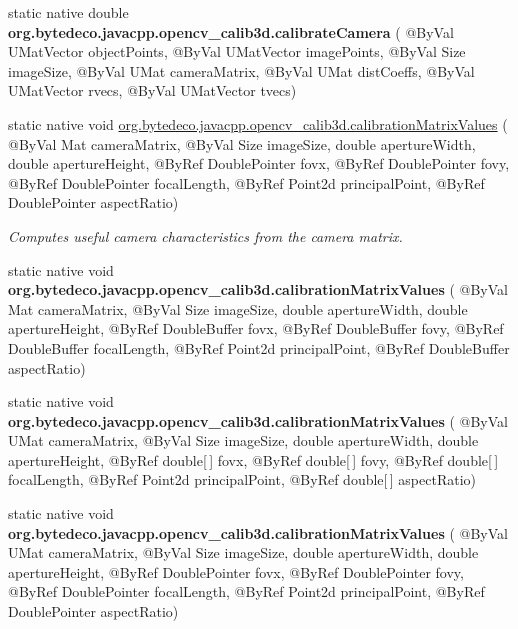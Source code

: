 \begin{DoxyCompactItemize}
static native double {\bfseries org.\+bytedeco.\+javacpp.\+opencv\+\_\+calib3d.\+calibrate\+Camera} ( @By\+Val U\+Mat\+Vector object\+Points, @By\+Val U\+Mat\+Vector image\+Points, @By\+Val Size image\+Size, @By\+Val U\+Mat camera\+Matrix, @By\+Val U\+Mat dist\+Coeffs, @By\+Val U\+Mat\+Vector rvecs, @By\+Val U\+Mat\+Vector tvecs)
\item 
static native void \hyperlink{group__calib3d_ga35bea5b10b8dfd23238f72e9a2e2ac27}{org.\+bytedeco.\+javacpp.\+opencv\+\_\+calib3d.\+calibration\+Matrix\+Values} ( @By\+Val Mat camera\+Matrix, @By\+Val Size image\+Size, double aperture\+Width, double aperture\+Height, @By\+Ref Double\+Pointer fovx, @By\+Ref Double\+Pointer fovy, @By\+Ref Double\+Pointer focal\+Length, @By\+Ref Point2d principal\+Point, @By\+Ref Double\+Pointer aspect\+Ratio)
\begin{DoxyCompactList}\small\item\em Computes useful camera characteristics from the camera matrix. \end{DoxyCompactList}\item 
\mbox{\label{group__calib3d_ga965805632830d6c180c894a5e9c1a1c6}} 
static native void {\bfseries org.\+bytedeco.\+javacpp.\+opencv\+\_\+calib3d.\+calibration\+Matrix\+Values} ( @By\+Val Mat camera\+Matrix, @By\+Val Size image\+Size, double aperture\+Width, double aperture\+Height, @By\+Ref Double\+Buffer fovx, @By\+Ref Double\+Buffer fovy, @By\+Ref Double\+Buffer focal\+Length, @By\+Ref Point2d principal\+Point, @By\+Ref Double\+Buffer aspect\+Ratio)
\item 
\mbox{\label{group__calib3d_ga3624140df267680d7e2d3272dce97372}} 
static native void {\bfseries org.\+bytedeco.\+javacpp.\+opencv\+\_\+calib3d.\+calibration\+Matrix\+Values} ( @By\+Val U\+Mat camera\+Matrix, @By\+Val Size image\+Size, double aperture\+Width, double aperture\+Height, @By\+Ref double\mbox{[}$\,$\mbox{]} fovx, @By\+Ref double\mbox{[}$\,$\mbox{]} fovy, @By\+Ref double\mbox{[}$\,$\mbox{]} focal\+Length, @By\+Ref Point2d principal\+Point, @By\+Ref double\mbox{[}$\,$\mbox{]} aspect\+Ratio)
\item 
\mbox{\label{group__calib3d_gaa693381b532e9d003b629baa4f01a0fa}} 
static native void {\bfseries org.\+bytedeco.\+javacpp.\+opencv\+\_\+calib3d.\+calibration\+Matrix\+Values} ( @By\+Val U\+Mat camera\+Matrix, @By\+Val Size image\+Size, double aperture\+Width, double aperture\+Height, @By\+Ref Double\+Pointer fovx, @By\+Ref Double\+Pointer fovy, @By\+Ref Double\+Pointer focal\+Length, @By\+Ref Point2d principal\+Point, @By\+Ref Double\+Pointer aspect\+Ratio)

\end{DoxyCompactItemize}
